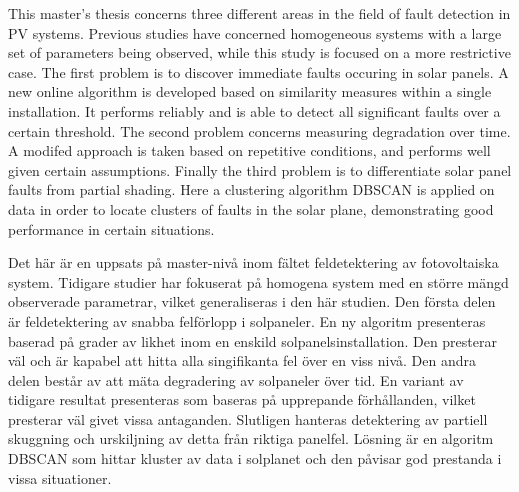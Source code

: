 \newenvironment{abstractpage}
  {\cleardoublepage\vspace*{\fill}\thispagestyle{empty}}
  {\vfill\cleardoublepage}
\newenvironment{polyAbstract}[1]
  {\bigskip\selectlanguage{#1}%
   \begin{center}\bfseries\abstractname\end{center}}
  {\par\bigskip}

\begin{abstractpage}
\begin{polyAbstract}{english}
This master's thesis concerns three different areas in the field of fault detection in PV systems.
Previous studies have concerned homogeneous systems with a large set of parameters being observed, while this study is focused on a more restrictive case.
The first problem is to discover immediate faults occuring in solar panels.
A new online algorithm is developed based on similarity measures within a single installation.
It performs reliably and is able to detect all significant faults over a certain threshold.
The second problem concerns measuring degradation over time.
A modifed approach is taken based on repetitive conditions, and performs well given certain assumptions.
Finally the third problem is to differentiate solar panel faults from partial shading.
Here a clustering algorithm DBSCAN is applied on data in order to locate clusters of faults in the solar plane, demonstrating good performance in certain situations.

\end{polyAbstract}

\begin{polyAbstract}{swedish}
Det här är en uppsats på master-nivå inom fältet feldetektering av fotovoltaiska system.
Tidigare studier har fokuserat på homogena system med en större mängd observerade parametrar, vilket generaliseras i den här studien.
Den första delen är feldetektering av snabba felförlopp i solpaneler.
En ny algoritm presenteras baserad på grader av likhet inom en enskild solpanelsinstallation.
Den presterar väl och är kapabel att hitta alla singifikanta fel över en viss nivå.
Den andra delen består av att mäta degradering av solpaneler över tid.
En variant av tidigare resultat presenteras som baseras på upprepande förhållanden, vilket presterar väl givet vissa antaganden.
Slutligen hanteras detektering av partiell skuggning och urskiljning av detta från riktiga panelfel.
Lösning är en algoritm DBSCAN som hittar kluster av data i solplanet och den påvisar god prestanda i vissa situationer.

\end{polyAbstract}
\end{abstractpage}

